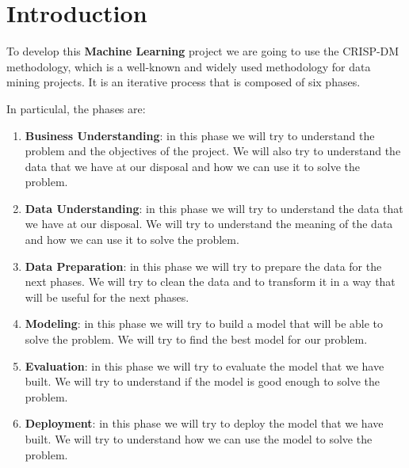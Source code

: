 \section{Introduction}
\label{sec:introduction}

To develop this \textbf{Machine Learning} project we are going to use the CRISP-DM methodology, which is a well-known and widely used methodology for data mining projects. It is an iterative process that is composed of six phases.

In particulal, the phases are:
\begin{enumerate}
    \item \textbf{Business Understanding}: in this phase we will try to understand the problem and the objectives of the project. We will also try to understand the data that we have at our disposal and how we can use it to solve the problem.
    \item \textbf{Data Understanding}: in this phase we will try to understand the data that we have at our disposal. We will try to understand the meaning of the data and how we can use it to solve the problem.
    \item \textbf{Data Preparation}: in this phase we will try to prepare the data for the next phases. We will try to clean the data and to transform it in a way that will be useful for the next phases.
    \item \textbf{Modeling}: in this phase we will try to build a model that will be able to solve the problem. We will try to find the best model for our problem.
    \item \textbf{Evaluation}: in this phase we will try to evaluate the model that we have built. We will try to understand if the model is good enough to solve the problem.
    \item \textbf{Deployment}: in this phase we will try to deploy the model that we have built. We will try to understand how we can use the model to solve the problem.
\end{enumerate}

